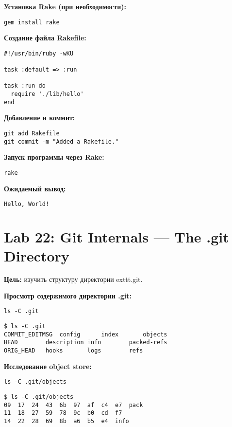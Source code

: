\documentclass[a4paper,12pt]{report}
\begin{document}
\textbf{Установка Rake (при необходимости):}
\begin{verbatim}
gem install rake
\end{verbatim}

\textbf{Создание файла Rakefile:}
\begin{verbatim}
#!/usr/bin/ruby -wKU

task :default => :run

task :run do
  require './lib/hello'
end
\end{verbatim}

\textbf{Добавление и коммит:}
\begin{verbatim}
git add Rakefile
git commit -m "Added a Rakefile."
\end{verbatim}


\textbf{Запуск программы через Rake:}
\begin{verbatim}
rake
\end{verbatim}

\textbf{Ожидаемый вывод:}
\begin{verbatim}
Hello, World!
\end{verbatim}


\section{Lab 22: Git Internals — The .git Directory}

\textbf{Цель:} изучить структуру директории 	exttt{.git}.

\textbf{Просмотр содержимого директории .git:}
\begin{verbatim}
ls -C .git
\end{verbatim}
\begin{verbatim}
$ ls -C .git
COMMIT_EDITMSG	config		index		objects
HEAD		description	info		packed-refs
ORIG_HEAD	hooks		logs		refs
\end{verbatim}


\textbf{Исследование object store:}
\begin{verbatim}
ls -C .git/objects
\end{verbatim}
\begin{verbatim}
$ ls -C .git/objects
09	17	24	43	6b	97	af	c4	e7	pack
11	18	27	59	78	9c	b0	cd	f7
14	22	28	69	8b	a6	b5	e4	info
\end{verbatim}
\end{document}
